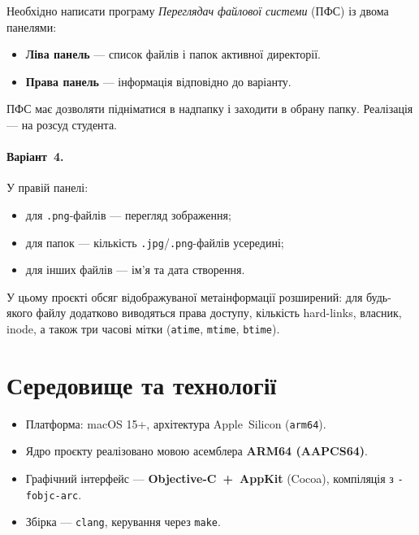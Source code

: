 \documentclass[12pt,a4paper]{article}
\begin{document}
Необхідно написати програму \emph{Переглядач файлової системи} (ПФС)
із двома панелями:

\begin{itemize}
  \item \textbf{Ліва панель} --- список файлів і папок активної директорії.
  \item \textbf{Права панель} --- інформація відповідно до варіанту.
\end{itemize}

ПФС має дозволяти підніматися в надпапку і заходити в обрану папку.
Реалізація --- на розсуд студента.

\paragraph{Варіант~4.} У правій панелі:
\begin{itemize}
  \item для \texttt{.png}-файлів --- перегляд зображення;
  \item для папок --- кількість \texttt{.jpg}/\texttt{.png}-файлів усередині;
  \item для інших файлів --- ім'я та дата створення.
\end{itemize}

У цьому проєкті обсяг відображуваної метаінформації розширений:
для будь-якого файлу додатково виводяться права доступу,
кількість hard-links, власник, inode, а також три часові мітки
(\texttt{atime}, \texttt{mtime}, \texttt{btime}).

\section{Середовище та технології}

\begin{itemize}
  \item Платформа: macOS 15+, архітектура Apple~Silicon (\texttt{arm64}).
  \item Ядро проєкту реалізовано мовою асемблера \textbf{ARM64 (AAPCS64)}.
  \item Графічний інтерфейс --- \textbf{Objective-C~+~AppKit} (Cocoa),
        компіляція з \texttt{-fobjc-arc}.
  \item Збірка --- \texttt{clang}, керування через \texttt{make}.
\end{itemize}
\end{document}
